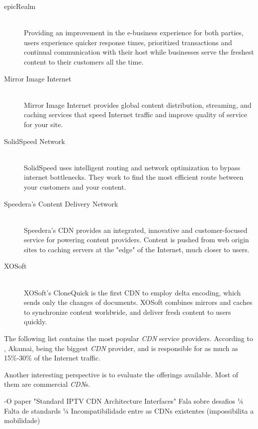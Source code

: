 \documentclass{llncs}
\begin{document}
\begin{description}
\item[epicRealm] \hfill \\
Providing an improvement in the e-business experience for both parties, users
experience quicker response times, prioritized transactions and continual
communication with their host while businesses serve the freshest content to
their customers all the time.

\item[Mirror Image Internet] \hfill \\
Mirror Image Internet provides global content distribution, streaming, and
caching services that speed Internet traffic and improve quality of service for
your site.

\item[SolidSpeed Network] \hfill \\
SolidSpeed uses intelligent routing and network optimization to bypass internet
bottlenecks. They work to find the most efficient route between your customers
and your content.

\item[Speedera's Content Delivery Network] \hfill \\
Speedera's CDN provides an integrated, innovative and customer-focused
service for powering content providers. Content is pushed from web origin sites
to caching servers at the "edge" of the Internet, much closer to users.

\item[XOSoft] \hfill \\
XOSoft's CloneQuick is the first CDN to employ delta encoding, which sends only
the changes of documents. XOSoft combines mirrors and caches to synchronize
content worldwide, and deliver fresh content to users quickly.

\end{description}


\if
The following list contains the most popular \textit{CDN} service providers. According to \cite{reuters}, Akamai, being the biggest \textit{CDN} provider, and is responsible for as much as 15\%-30\% of the Internet traffic.

Another interesting perspective is to evaluate the offerings available. Most of them are commercial \textit{CDN}s. 


-O paper "Standard IPTV CDN Architecture Interfaces" Fala sobre desafios
		¼ Falta de standards
		¼ Incompatibilidade entre as CDNs existentes (impossibilita a mobilidade)
\fi
	
\end{document}
